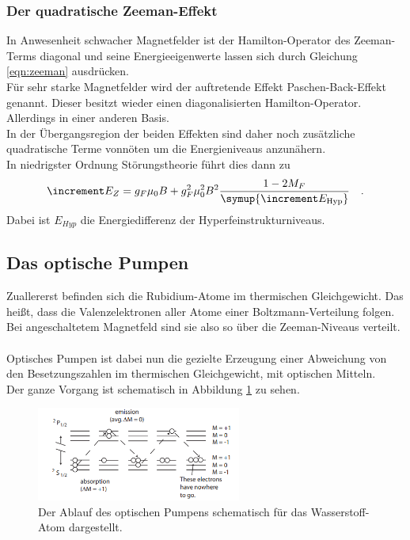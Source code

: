 \subsubsection{Der quadratische Zeeman-Effekt}

\noindent
In Anwesenheit schwacher Magnetfelder ist der Hamilton-Operator des Zeeman-Terms diagonal und seine Energieeigenwerte lassen sich durch Gleichung \ref{eqn:zeeman} ausdrücken.\\
Für sehr starke Magnetfelder wird der auftretende Effekt Paschen-Back-Effekt genannt. Dieser besitzt wieder einen diagonalisierten Hamilton-Operator. Allerdings in einer anderen Basis.\\
In der Übergangsregion der beiden Effekten sind daher noch zusätzliche quadratische Terme vonnöten um die Energieniveaus anzunähern.\\ 
In niedrigster Ordnung Störungstheorie führt dies dann zu
\begin{equation}
 \increment E_{Z} = g_F \mu_\text{0}B+g^2_F\mu^2_\text{0}B^2\frac{1-2M_F}{\symup{\increment E_\text{Hyp}}} \quad . 
 \label{eqn:zee_quad}
\end{equation} 
Dabei ist $E_{Hyp}$ die Energiedifferenz der Hyperfeinstrukturniveaus.

\subsection{Das optische Pumpen}

\noindent
Zuallererst befinden sich die Rubidium-Atome im thermischen Gleichgewicht. 
Das heißt, dass die Valenzelektronen aller Atome einer Boltzmann-Verteilung folgen. 
Bei angeschaltetem Magnetfeld sind sie also so über die Zeeman-Niveaus verteilt.\\\\
Optisches Pumpen ist dabei nun die gezielte Erzeugung einer Abweichung von den Besetzungszahlen im thermischen Gleichgewicht, mit optischen Mitteln.\\
Der ganze Vorgang ist schematisch in Abbildung \ref{img:pumpitup} zu sehen.

\begin{figure}[H]
    \centering
    \includegraphics[width=0.6\textwidth]{latex/images/pumping.PNG}
    \caption{Der Ablauf des optischen Pumpens schematisch für das Wasserstoff-Atom dargestellt\protect \cite{pump_1}.}
    \label{img:pumpitup}
\end{figure}

